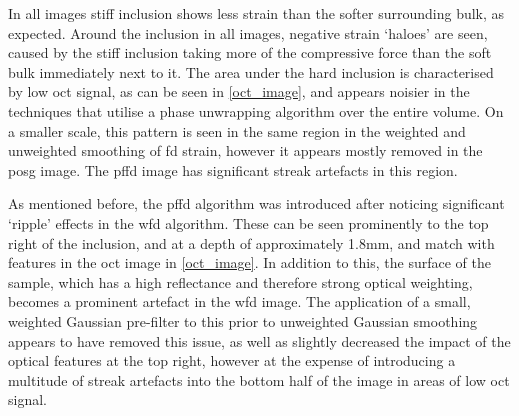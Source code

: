 In all images stiff inclusion shows less strain than the softer surrounding bulk, as expected. Around the inclusion in  all images, negative strain `haloes' are seen, caused by the stiff inclusion taking more of the compressive force than the soft bulk immediately next to it.
The area under the hard inclusion is characterised by low \ac{oct} signal, as can be seen in \autoref{oct_image}, and appears noisier in the techniques that utilise a phase unwrapping algorithm over the entire volume.
On a smaller scale, this pattern is seen in the same region in the weighted and unweighted smoothing of \ac{fd} strain, however it appears mostly removed in the \ac{posg} image.
The \ac{pffd} image has significant streak artefacts in this region. 

As mentioned before, the \ac{pffd} algorithm was introduced after noticing significant `ripple' effects in the \ac{wfd} algorithm. These can be seen prominently to the top right of the inclusion, and at a depth of approximately 1.8mm, and match with features in the \ac{oct} image in \autoref{oct_image}. In addition to this, the surface of the sample, which has a high reflectance and therefore strong optical weighting, becomes a prominent artefact in the \ac{wfd} image. The application of a small, weighted Gaussian pre-filter to this prior to unweighted Gaussian smoothing appears to have removed this issue, as well as slightly decreased the impact of the optical features at the top right, however at the expense of introducing a multitude of streak artefacts into the bottom half of the image in areas of low \ac{oct} signal.

